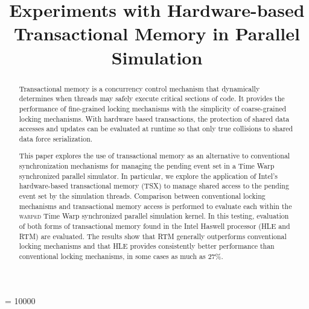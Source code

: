 \documentclass{sig-alternate}
\begin{document}
\widowpenalty = 10000

\title{Experiments with Hardware-based Transactional Memory in Parallel Simulation}


\author{
}

\maketitle

\begin{abstract}

Transactional memory is a concurrency control mechanism that dynamically determines when
threads may safely execute critical sections of code.  It provides the performance of
fine-grained locking mechanisms with the simplicity of coarse-grained locking mechanisms.
With hardware based transactions, the protection of shared data accesses and updates can
be evaluated at runtime so that only true collisions to shared data force serialization.

This paper explores the use of transactional memory as an alternative to conventional
synchronization mechanisms for managing the pending event set in a Time Warp synchronized
parallel simulator.  In particular, we explore the application of Intel's hardware-based
transactional memory (TSX) to manage shared access to the pending event set by the
simulation threads.  Comparison between conventional locking mechanisms and transactional
memory access is performed to evaluate each within the \textsc{warped} Time Warp
synchronized parallel simulation kernel.  In this testing, evaluation of both forms of
transactional memory found in the Intel Haswell processor (HLE and RTM) are evaluated.
The results show that RTM generally outperforms conventional locking mechanisms and that
HLE provides consistently better performance than conventional locking mechanisms, in some
cases as much as 27\%.

\end{abstract}
\end{document}

